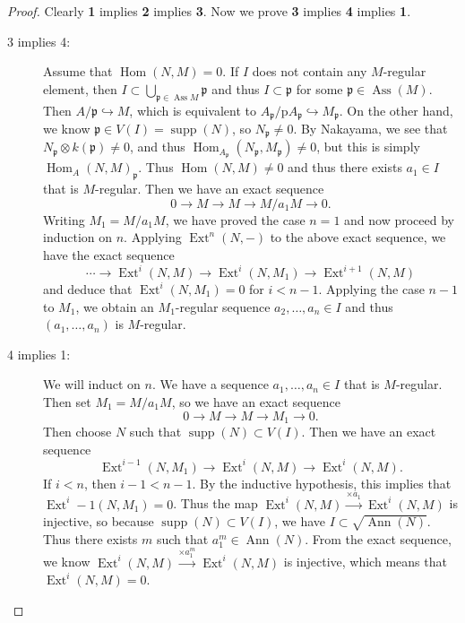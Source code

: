 \documentclass[leqno, openany]{memoir}
\theoremstyle{definition}
\theoremstyle{remark}
\theoremstyle{plain}
\theoremstyle{definition}
\theoremstyle{remark}
\newcommand{\mf}[1]{\mathfrak{#1}}
\newcommand{\mr}[1]{\mathrm{#1}}
\DeclareMathOperator{\Hom}{Hom}
\DeclareMathOperator{\supp}{supp}
\DeclareMathOperator{\Ext}{Ext}
\DeclareMathOperator{\Ann}{Ann}
\DeclareMathOperator{\Ass}{Ass}
\begin{document}
\begin{proof} Clearly \textbf{1} implies \textbf{2} implies \textbf{3}. Now we
    prove \textbf{3} implies \textbf{4} implies \textbf{1}.
    \begin{description} \item[3 implies 4:] Assume that $\Hom(N,M) = 0$. If $I$
        does not contain any $M$-regular element, then $I \subset
        \bigcup_{\mf{p} \in \Ass M} \mf{p}$ and thus $I \subset \mf{p}$ for
        some $\mf{p} \in \Ass(M)$. Then $A/\mf{p} \hookrightarrow M$, which is
        equivalent to $A_{\mf{p}} / \mr{p} A_{\mf{p}} \hookrightarrow
        M_{\mf{p}} $. On the other hand, we know $\mf{p} \in V(I) = \supp(N)$,
        so $N_{\mf{p}} \neq 0$. By Nakayama, we see that $N_{\mf{p}} \otimes
        k(\mf{p}) \neq 0$, and thus $\Hom_{A_{\mf{p}}}(N_{\mf{p}}, M_{\mf{p}})
        \neq 0$, but this is simply $\Hom_A(N,M)_{\mf{p}}$. Thus $\Hom(N,M)
        \neq 0$ and thus there exists $a_1 \in I$ that is $M$-regular. Then we
        have an exact sequence \[ 0 \to M \to M \to M/a_1 M \to 0. \] Writing
        $M_1 = M/a_1 M$, we have proved the case $n=1$ and now proceed by
        induction on $n$. Applying $\Ext^n(N,-)$ to the above exact sequence,
        we have the exact sequence \[ \cdots \to \Ext^i(N,M) \to \Ext^i(N,M_1)
        \to \Ext^{i+1}(N,M) \] and deduce that $\Ext^i(N,M_1) = 0$ for $i <
        n-1$. Applying the case $n-1$ to $M_1$, we obtain an $M_1$-regular
        sequence $a_2, \ldots, a_n \in I$ and thus $(a_1, \ldots, a_n)$ is
        $M$-regular.  \item[4 implies 1:] We will induct on $n$. We have a
        sequence $a_1, \ldots, a_n \in I$ that is $M$-regular. Then set $M_1 =
        M/a_1 M$, so we have an exact sequence \[ 0 \to M \to M \to M_1 \to 0.
        \] Then choose $N$ such that $\supp(N) \subset V(I)$. Then we have an
        exact sequence \[ \Ext^{i-1}(N, M_1) \to \Ext^i(N,M) \to \Ext^i(N,M).
        \] If $i < n$, then $i-1 < n-1$. By the inductive hypothesis, this
        implies that $\Ext^i-1(N, M_1) = 0$. Thus the map $\Ext^i(N,M)
        \xrightarrow{\times a_1} \Ext^i(N,M)$ is injective, so because
        $\supp(N) \subset V(I)$, we have $I \subset \sqrt{\Ann(N)}$. Thus there
        exists $m$ such that $a_1^m \in \Ann(N)$. From the exact sequence, we
        know $\Ext^i(N,M) \xrightarrow{\times a_1^m} \Ext^i(N,M)$ is injective,
        which means that $\Ext^i(N,M) = 0$. \qedhere \end{description}
    \end{proof}
\end{document}
